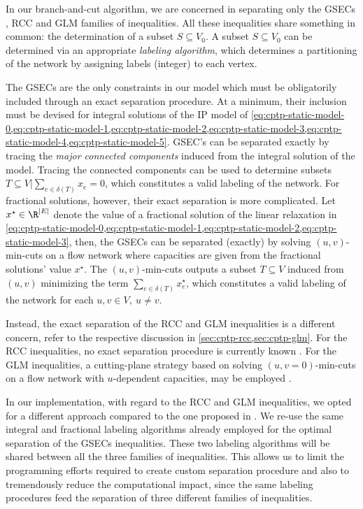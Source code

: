 In our branch-and-cut algorithm,
we are concerned in separating only the
GSECs ,
RCC 
and GLM 
families of inequalities.
All these inequalities share something in common:
the determination of a subset $S \subseteq V_0$.
A subset $S \subseteq V_0$ can be determined via an appropriate \textit{labeling algorithm},
which determines a partitioning of the network by assigning labels (integer) to each vertex.

The GSECs are the only constraints in our model which must be obligatorily
included through an exact separation procedure.
At a minimum, their inclusion must be devised
for integral solutions of the IP model of
\cref{eq:cptp-static-model-0,eq:cptp-static-model-1,eq:cptp-static-model-2,eq:cptp-static-model-3,eq:cptp-static-model-4,eq:cptp-static-model-5}.
GSEC's can be separated exactly
by tracing the \textit{major connected components}
induced from the integral solution of the model.
Tracing the connected components can be used to determine subsets
$T \subseteq V | \sum_{e \in \delta(T)} x_e = 0$,
which constitutes a valid labeling of the network.
For fractional solutions, however, their exact separation is more complicated.
Let $x^\star \in \R^{|E|}$ denote the value of a fractional solution of
the linear relaxation in
\cref{eq:cptp-static-model-0,eq:cptp-static-model-1,eq:cptp-static-model-2,eq:cptp-static-model-3},
then,
the GSECs can be separated (exactly) by solving $(u, v)$-min-cuts
on a flow network where capacities are given from the fractional solutions' value $x^\star$.
The $(u, v)$-min-cuts outputs a subset $T \subseteq V$ induced from $(u, v)$
minimizing the term $\sum_{e \in \delta(T)} x^\star_e$,
which constitutes a valid labeling of the network for each $u, v \in V,\ u \ne v$.

Instead, the exact separation of the RCC and GLM inequalities
is a different concern, refer to the respective discussion in \cref{sec:cptp-rcc,sec:cptp-glm}.
For the RCC inequalities,
no exact separation procedure is currently known \parencite{jepsen2014}.
For the GLM inequalities,
a cutting-plane strategy based on solving
$(u, v=0)$-min-cuts on a flow network with $u$-dependent capacities,
may be employed \parencite{letchford2006, jepsen2014}.

\medskip

In our implementation, with regard to the RCC and GLM inequalities,
we opted for a different approach compared to the one proposed in \textcite{jepsen2014}.
We re-use the same integral and fractional labeling algorithms
already employed for the optimal separation of the GSECs inequalities.
These two labeling algorithms will be shared between all the three families of inequalities.
This allows us to limit the programming efforts required to create custom
separation procedure
and also to tremendously reduce the computational impact,
since the same labeling procedures feed the separation of three different families of inequalities.

